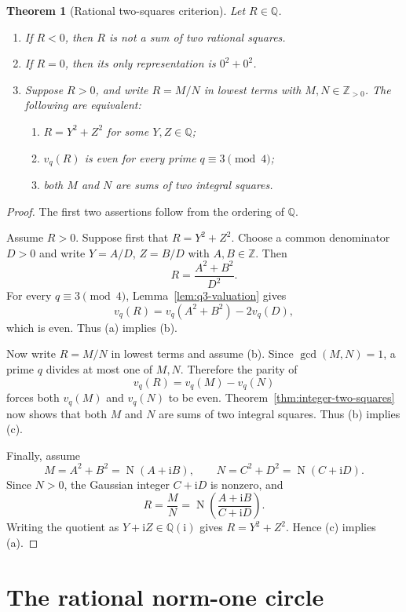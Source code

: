 \documentclass[11pt,a4paper]{article}
\numberwithin{equation}{section}
\newtheorem{theorem}{Theorem}[section]
\theoremstyle{definition}
\newcommand{\Q}{\mathbb{Q}}
\newcommand{\Z}{\mathbb{Z}}
\newcommand{\N}{\operatorname{N}}
\newcommand{\ii}{\mathrm{i}}
\begin{document}
\begin{theorem}[Rational two-squares criterion]
\label{thm:rational-two-squares}
Let $R\in\Q$.
\begin{enumerate}
\item If $R<0$, then $R$ is not a sum of two rational squares.
\item If $R=0$, then its only representation is $0^2+0^2$.
\item Suppose $R>0$, and write $R=M/N$ in lowest terms with $M,N\in\Z_{>0}$. The following are equivalent:
\begin{enumerate}[label=(\alph*),leftmargin=2.4em]
\item $R=Y^2+Z^2$ for some $Y,Z\in\Q$;
\item $v_q(R)$ is even for every prime $q\equiv3\pmod4$;
\item both $M$ and $N$ are sums of two integral squares.
\end{enumerate}
\end{enumerate}
\end{theorem}

\begin{proof}
The first two assertions follow from the ordering of $\Q$.

Assume $R>0$. Suppose first that $R=Y^2+Z^2$. Choose a common denominator $D>0$ and write $Y=A/D$, $Z=B/D$ with $A,B\in\Z$. Then
\[
 R=\frac{A^2+B^2}{D^2}.
\]
For every $q\equiv3\pmod4$, Lemma~\ref{lem:q3-valuation} gives
\[
 v_q(R)=v_q(A^2+B^2)-2v_q(D),
\]
which is even. Thus (a) implies (b).

Now write $R=M/N$ in lowest terms and assume (b). Since $\gcd(M,N)=1$, a prime $q$ divides at most one of $M,N$. Therefore the parity of
\[
 v_q(R)=v_q(M)-v_q(N)
\]
forces both $v_q(M)$ and $v_q(N)$ to be even. Theorem~\ref{thm:integer-two-squares} now shows that both $M$ and $N$ are sums of two integral squares. Thus (b) implies (c).

Finally, assume
\[
 M=A^2+B^2=\N(A+\ii B),
 \qquad
 N=C^2+D^2=\N(C+\ii D).
\]
Since $N>0$, the Gaussian integer $C+\ii D$ is nonzero, and
\[
 R=\frac{M}{N}
 =\N\!\left(\frac{A+\ii B}{C+\ii D}\right).
\]
Writing the quotient as $Y+\ii Z\in\Q(\ii)$ gives $R=Y^2+Z^2$. Hence (c) implies (a).
\end{proof}

\section{The rational norm-one circle}
\end{document}
